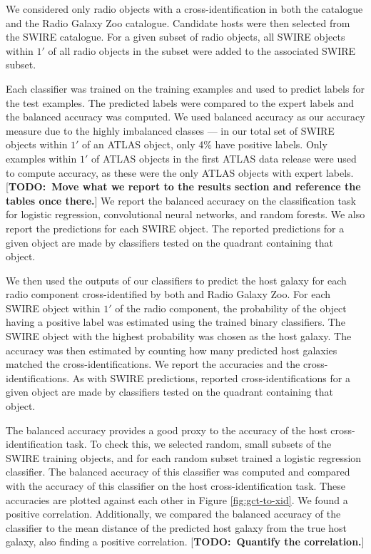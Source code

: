 \documentclass[fleqn,usenatbib,usedcolumn]{mnras}
\newcommand{\todo}[1]{ {\color{red}[{\bf TODO:~{#1}}]} }
\begin{document}
    We considered only radio objects with a cross-identification in both the
    \citet{norris06} catalogue and the Radio Galaxy Zoo catalogue. Candidate
    hosts were then selected from the SWIRE catalogue. For a given subset of
    radio objects, all SWIRE objects within $1'$ of all radio objects in the
    subset were added to the associated SWIRE subset.

    Each classifier was trained on the training examples and used to predict
    labels for the test examples. The predicted labels were compared to the
    expert labels and the balanced accuracy was computed. We used balanced
    accuracy as our accuracy measure due to the highly imbalanced classes --- in
    our total set of SWIRE objects within $1'$ of an ATLAS object, only 4\% have
    positive labels. Only examples within $1'$ of ATLAS objects in the first
    ATLAS data release \citep{norris06} were used to compute accuracy, as these
    were the only ATLAS objects with expert labels. \todo{Move what we report to
    the results section and reference the tables once there.} We report the
    balanced accuracy on the classification task for logistic regression,
    convolutional neural networks, and random forests. We also report the
    predictions for each SWIRE object. The reported predictions for a given
    object are made by classifiers tested on the quadrant containing that
    object.

    We then used the outputs of our classifiers to predict the host galaxy
    for each radio component cross-identified by both \citet{norris06}
    and Radio Galaxy Zoo. For each SWIRE object within $1'$ of the radio
    component, the probability of the object having a positive label was
    estimated using the trained binary classifiers. The SWIRE object with
    the highest probability was chosen as the host galaxy. The accuracy was
    then estimated by counting how many predicted host galaxies matched the
    \citet{norris06} cross-identifications. We report the accuracies and the
    cross-identifications. As with SWIRE predictions, reported
    cross-identifications for a given object are made by classifiers tested
    on the quadrant containing that object.

    The balanced accuracy provides a good proxy to the accuracy of the host
    cross-identification task. To check this, we selected random, small
    subsets of the SWIRE training objects, and for each random subset trained
    a logistic regression classifier. The balanced accuracy of this classifier
    was computed and compared with the accuracy of this classifier on the host
    cross-identification task. These accuracies are plotted against each other
    in Figure \ref{fig:gct-to-xid}. We found a positive correlation.
    Additionally, we compared the balanced accuracy of the classifier to the
    mean distance of the predicted host galaxy from the true host galaxy, also
    finding a positive correlation. \todo{Quantify the correlation.}
\end{document}
